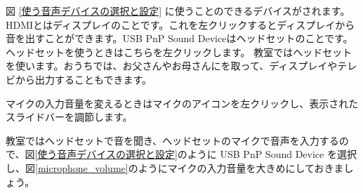 図 \ref{使う音声デバイスの選択と設定} に使うことのできるデバイスがされます。HDMIとはディスプレイのことです。これを左クリックするとディスプレイから音を出すことができます。USB PnP Sound Deviceはヘッドセットのことです。ヘッドセットを使うときはこちらを左クリックします。
教室ではヘッドセットを使います。おうちでは、お父さんやお母さんにを取って、ディスプレイやテレビから出力することもできます。

マイクの入力音量を変えるときはマイクのアイコンを左クリックし、表示されたスライドバーを調節します。



教室ではヘッドセットで音を聞き、ヘッドセットのマイクで音声を入力するので、図\ref{使う音声デバイスの選択と設定}のように USB PnP Sound Device を選択し、図\ref{microphone_volume}のようにマイクの入力音量を大きめにしておきましょう。
